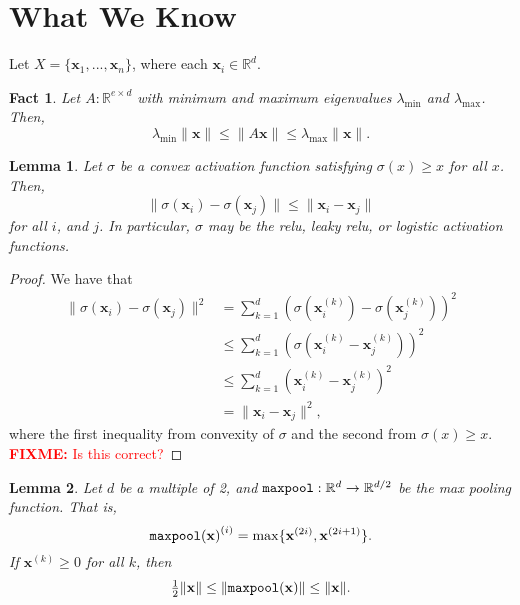 \documentclass{article}
\newtheorem{lemma}{Lemma}
\newtheorem{fact}{Fact}
\newcommand{\R}{\mathbb{R}}
\newcommand{\ltwo}[1]{\lVert {#1} \rVert}
\newcommand{\x}{\mathbf x}
\newcommand{\fixme}[1]{\textcolor{red}{\textbf{FIXME:} {#1}}}
\newcommand{\emin}{\lambda_{\text{min}}}
\newcommand{\emax}{\lambda_{\text{max}}}
\DeclareMathOperator{\maxpool}{\textup{\texttt{maxpool}}}
\begin{document}

\section{What We Know}

Let $X=\{\x_1,...,\x_n\}$, where each $\x_i\in\R^d$.

\newcommand{\elem}[2]{{#2}^{(#1)}}

\begin{fact}
    Let $A : \R^{e\times d}$ with minimum and maximum eigenvalues $\emin$ and $\emax$.
    Then,
    \begin{equation}
        \emin\ltwo{\x} \le \ltwo{A\x} \le \emax\ltwo{\x}.
    \end{equation}
\end{fact}

\begin{lemma}
    Let $\sigma$ be a convex activation function satisfying $\sigma(x)\ge x$ for all $x$.
    Then,
    \begin{equation}
        \ltwo{\sigma(\x_i)-\sigma(\x_j)}
        \le
        \ltwo{\x_i-\x_j} 
    \end{equation}
    for all $i$, and $j$.
    In particular, $\sigma$ may be the relu, leaky relu, or logistic activation functions.
\end{lemma}

\begin{proof}
    We have that
    \begin{align}
        \ltwo{\sigma(\x_i) - \sigma(\x_j)}^2 
        &=
        \sum_{k=1}^d (\sigma(\elem k\x_i) - \sigma(\elem k\x_j))^2
        \\&\le
        \sum_{k=1}^d (\sigma(\elem k\x_i - \elem k\x_j))^2
        \\&\le
        \sum_{k=1}^d (\elem k\x_i - \elem k\x_j)^2
        \\&= 
        \ltwo{\x_i - \x_j}^2 
        ,
    \end{align}
    where the first inequality from convexity of $\sigma$ and the second from $\sigma(x)\ge x$.
    \fixme{Is this correct?}
\end{proof}

\begin{lemma}
    Let $d$ be a multiple of 2, and $\maxpool : \R^d \to \R^{d/2}$ be the max pooling function.
    That is,
    \begin{equation}
        \elem{i}{\maxpool(\x)} = \max\{\elem{2i}\x,\elem{2i+1}\x\}
        .
    \end{equation}
    If $\elem k\x\ge0$ for all $k$, then
    \begin{equation}
        \tfrac12\ltwo{\x} \le \ltwo{\maxpool(\x)} \le \ltwo{\x}.
    \end{equation}
\end{lemma}
\end{document}
